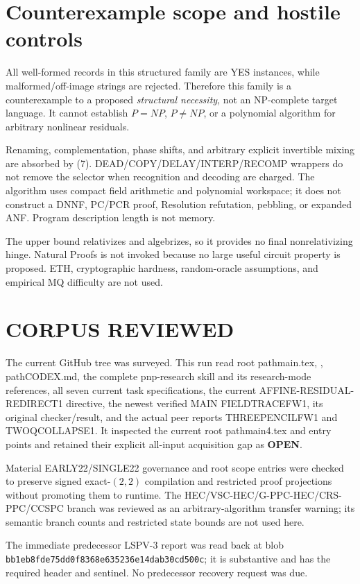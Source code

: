 \documentclass[11pt]{article}
\newcommand{\OPEN}{\textbf{OPEN}}
\begin{document}
\section{Counterexample scope and hostile controls}
All well-formed records in this structured family are YES instances, while
malformed/off-image strings are rejected.  Therefore this family is a
counterexample to a proposed \emph{structural necessity}, not an NP-complete
target language.  It cannot establish $P=NP$, $P\ne NP$, or a polynomial
algorithm for arbitrary nonlinear residuals.

Renaming, complementation, phase shifts, and arbitrary explicit invertible
mixing are absorbed by (7).  DEAD/COPY/DELAY/INTERP/RECOMP wrappers do not
remove the selector when recognition and decoding are charged.  The algorithm
uses compact field arithmetic and polynomial workspace; it does not construct
a DNNF, PC/PCR proof, Resolution refutation, pebbling, or expanded ANF.
Program description length is not memory.

The upper bound relativizes and algebrizes, so it provides no final
nonrelativizing hinge.  Natural Proofs is not invoked because no large useful
circuit property is proposed.  ETH, cryptographic hardness, random-oracle
assumptions, and empirical MQ difficulty are not used.

\section{CORPUS REVIEWED}
The current GitHub tree was surveyed.  This run read root path{main.tex},
, path{CODEX.md}, the complete pnp-research skill and its
research-mode references, all seven current task specifications, the current
AFFINE-RESIDUAL-REDIRECT1 directive, the newest verified MAIN FIELDTRACEFW1,
its original checker/result, and the actual peer reports THREEPENCILFW1 and
TWOQCOLLAPSE1.  It inspected the current root path{main4.tex} and
 entry points and retained their explicit all-input acquisition
gap as \OPEN{}.

Material EARLY22/SINGLE22 governance and root scope entries were checked to
preserve signed exact-$(2,2)$ compilation and restricted proof projections
without promoting them to runtime.  The HEC/VSC-HEC/G-PPC-HEC/CRS-PPC/CCSPC
branch was reviewed as an arbitrary-algorithm transfer warning; its semantic
branch counts and restricted state bounds are not used here.

The immediate predecessor LSPV-3 report
was read back at blob
\texttt{bb1eb8fde75dd0f8368e635236e14dab30cd500c}; it is substantive and has
the required header and sentinel.  No predecessor recovery request was due.
\end{document}
